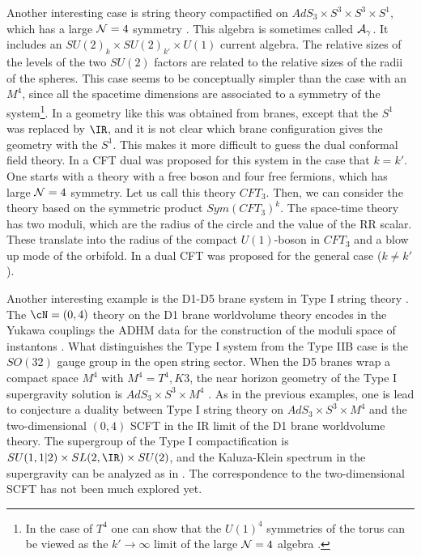 Another 
 interesting case is string theory compactified on $AdS_3\times S^3 \times
S^3 \times S^1 $, which has a large ${\cal N}=4$ 
symmetry \cite{Boonstra:1998yu,Elitzur:1998mm,deBoer:1999rh}.
 This algebra is sometimes called ${\cal A}_\gamma$.
It includes an $SU(2)_k \times SU(2)_{k'} \times U(1) $ current algebra. 
The relative sizes of the 
levels of the two $SU(2)$ factors are related to the relative sizes
of the  radii of the 
spheres. This case seems to be conceptually simpler than the case
with an $M^4$, since all the spacetime dimensions are 
associated to a symmetry of the system\footnote{In the case of $T^4$
one can show that the $U(1)^4$ symmetries of the torus can 
be viewed as the $ k' \to \infty $ limit of the large $ {\cal N} = 4$ 
algebra \cite{Maldacena:1999bp}.}.
In  \cite{Boonstra:1998yu} 
 a geometry like this was obtained from branes, except that
the $S^1$ was 
replaced by $\IR$, and it is not clear which brane configuration 
gives the geometry with the $S^1$. This makes it more difficult
to guess the dual conformal field theory.
 In \cite{Elitzur:1998mm} a CFT dual was proposed for this system
in the case that $k=k'$. One starts with a theory with a free boson
and four free fermions, which has large ${\cal N} = 4$ symmetry. Let
us call this theory $CFT_3$. Then, we can consider the theory
based on the symmetric product $Sym(CFT_3)^k $. 
The space-time 
 theory has two moduli, which are the radius of the circle and the
value of the RR scalar. These translate into the  radius of the 
compact  
$U(1)$-boson in $CFT_3$ and a  blow up mode of the orbifold.
In \cite{deBoer:1999rh} a dual CFT was proposed for the general case 
($k \not = k'$). 


Another interesting example is 
the D1-D5 brane system in Type I string theory
\cite{Johnson:1998ms,Barbon:1998ln,Oz:1999it}.
The $\cN=(0,4)$ theory on the D1 brane worldvolume theory 
encodes in the Yukawa
couplings the ADHM data for the
construction 
of the moduli space of instantons \cite{Douglas:1996gf, Witten:1994sm}.
What distinguishes 
the Type I system from the Type IIB case is the $SO(32)$
gauge group in the open string sector.
When the D5 branes wrap a compact space $M^4$ with $M^4=T^4,K3$, 
the near horizon geometry
of the Type I supergravity solution
is $AdS_3\times S^3\times M^4$ \cite{Oz:1999it}. 
As in the previous examples, one is lead
to conjecture
a duality between Type I string theory on $AdS_3\times S^3\times M^4$ 
and the two-dimensional $(0,4)$ SCFT in the IR limit
of the D1 brane worldvolume theory.
 The supergroup of the Type I compactification
is $SU(1,1|2)\times SL(2,\IR)\times SU(2)$, 
and the Kaluza-Klein spectrum in the supergravity
can be analyzed
as in \cite{deBoer:1998ip}. 
The correspondence to the two-dimensional SCFT has not been much
explored
yet. 



